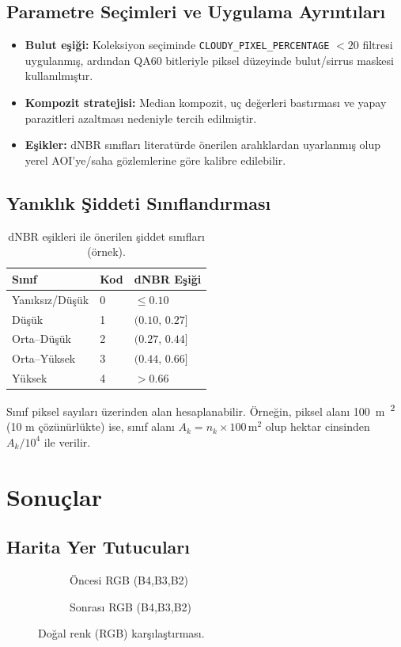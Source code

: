\documentclass[11pt,a4paper]{article}
\begin{document}
\subsection*{Parametre Seçimleri ve Uygulama Ayrıntıları}
\begin{itemize}
  \item \textbf{Bulut eşiği:} Koleksiyon seçiminde \texttt{CLOUDY\_PIXEL\_PERCENTAGE} $<20$
  filtresi uygulanmış, ardından QA60 bitleriyle piksel düzeyinde bulut/sirrus maskesi
  kullanılmıştır.
  \item \textbf{Kompozit stratejisi:} Median kompozit, uç değerleri bastırması ve
  yapay parazitleri azaltması nedeniyle tercih edilmiştir.
  \item \textbf{Eşikler:} dNBR sınıfları literatürde önerilen aralıklardan uyarlanmış
  olup yerel AOI’ye/saha gözlemlerine göre kalibre edilebilir.
\end{itemize}

\subsection*{Yanıklık Şiddeti Sınıflandırması}
\begin{table}[h]
  \centering
  \begin{tabular}{@{}lll@{}}\toprule
  Sınıf & Kod & dNBR Eşiği \\\midrule
  Yanıksız/Düşük & 0 & $\leq 0.10$ \\
  Düşük & 1 & $(0.10,\,0.27]$ \\
  Orta--Düşük & 2 & $(0.27,\,0.44]$ \\
  Orta--Yüksek & 3 & $(0.44,\,0.66]$ \\
  Yüksek & 4 & $> 0.66$ \\\bottomrule
  \end{tabular}
  \caption{dNBR eşikleri ile önerilen şiddet sınıfları (örnek).}
\end{table}

Sınıf piksel sayıları üzerinden alan hesaplanabilir. Örneğin, piksel alanı \SI{100}{m\textsuperscript{2}}
(10 m çözünürlükte) ise, sınıf alanı $A_k = n_k \times 100\,\mathrm{m^2}$ olup
hektar cinsinden $A_k/10^4$ ile verilir.

\section{Sonuçlar}
\subsection*{Harita Yer Tutucuları}
\begin{figure}[h]
  \centering
  \begin{subfigure}[b]{0.48\textwidth}
    \centering
    \caption{Öncesi RGB (B4,B3,B2)}
  \end{subfigure}\hfill
  \begin{subfigure}[b]{0.48\textwidth}
    \centering
    \caption{Sonrası RGB (B4,B3,B2)}
  \end{subfigure}
  \caption{Doğal renk (RGB) karşılaştırması.}
\end{figure}
\end{document}
